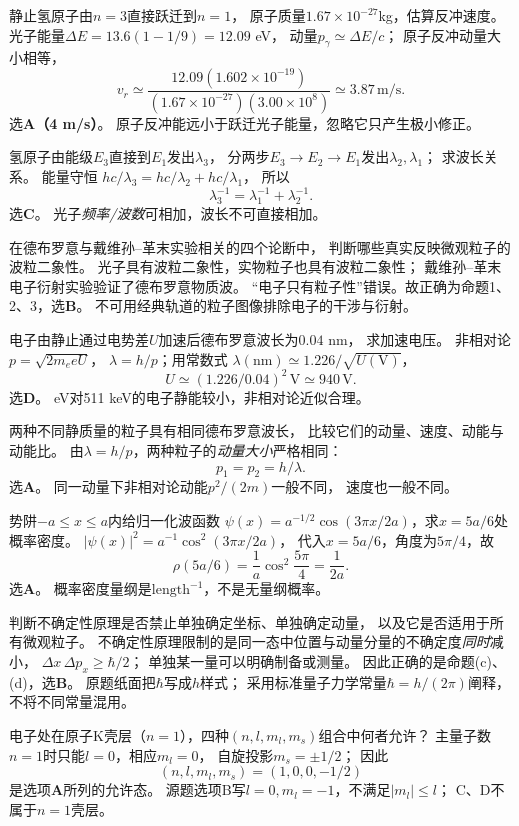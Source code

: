 \problemtext 静止氢原子由$n=3$直接跃迁到$n=1$，
原子质量$1.67\times10^{-27}$kg，估算反冲速度。
\workings
光子能量$\Delta E=13.6(1-1/9)=12.09$ eV，
动量$p_\gamma\simeq\Delta E/c$；
原子反冲动量大小相等，
\[
\boxed{v_r\simeq\frac{12.09(1.602\times10^{-19})}
{(1.67\times10^{-27})(3.00\times10^8)}
\simeq3.87\,\mathrm{m/s}}.
\]
选\textbf{A（4 m/s）}。
\crosscheck 原子反冲能远小于跃迁光子能量，忽略它只产生极小修正。

\problemtext 氢原子由能级$E_3$直接到$E_1$发出$\lambda_3$，
分两步$E_3\to E_2\to E_1$发出$\lambda_2,\lambda_1$；
求波长关系。
\workings
能量守恒
$hc/\lambda_3=hc/\lambda_2+hc/\lambda_1$，
所以
\[
\boxed{\lambda_3^{-1}=\lambda_1^{-1}+\lambda_2^{-1}}.
\]
选\textbf{C}。
\crosscheck 光子\emph{频率/波数}可相加，波长不可直接相加。

\problemtext 在德布罗意与戴维孙--革末实验相关的四个论断中，
判断哪些真实反映微观粒子的波粒二象性。
\workings
光子具有波粒二象性，实物粒子也具有波粒二象性；
戴维孙--革末电子衍射实验验证了德布罗意物质波。
“电子只有粒子性”错误。故正确为命题1、2、3，选\textbf{B}。
\crosscheck 不可用经典轨道的粒子图像排除电子的干涉与衍射。

\problemtext 电子由静止通过电势差$U$加速后德布罗意波长为$0.04$ nm，
求加速电压。
\workings
非相对论$p=\sqrt{2m_e eU}$，
$\lambda=h/p$；用常数式
$\lambda(\mathrm{nm})\simeq1.226/\sqrt{U(\mathrm V)}$，
\[
\boxed{U\simeq(1.226/0.04)^2\,\mathrm V
\simeq940\,\mathrm V}.
\]
选\textbf{D}。
 eV对511 keV的电子静能较小，非相对论近似合理。

\problemtext 两种不同静质量的粒子具有相同德布罗意波长，
比较它们的动量、速度、动能与动能比。
\workings
由$\lambda=h/p$，两种粒子的\emph{动量大小}严格相同：
\[
\boxed{p_1=p_2=h/\lambda}.
\]
选\textbf{A}。
\crosscheck 同一动量下非相对论动能$p^2/(2m)$一般不同，
速度也一般不同。

\problemtext 势阱$-a\le x\le a$内给归一化波函数
$\psi(x)=a^{-1/2}\cos(3\pi x/2a)$，求$x=5a/6$处概率密度。
\workings
$|\psi(x)|^2=a^{-1}\cos^2(3\pi x/2a)$，
代入$x=5a/6$，角度为$5\pi/4$，故
\[
\boxed{\rho(5a/6)=\frac1a\cos^2\frac{5\pi}{4}=\frac1{2a}}.
\]
选\textbf{A}。
\crosscheck 概率密度量纲是$\mathrm{length}^{-1}$，不是无量纲概率。

\problemtext 判断不确定性原理是否禁止单独确定坐标、单独确定动量，
以及它是否适用于所有微观粒子。
\workings
不确定性原理限制的是同一态中位置与动量分量的不确定度\emph{同时}减小，
$\Delta x\,\Delta p_x\ge\hbar/2$；
单独某一量可以明确制备或测量。
因此正确的是命题(c)、(d)，选\textbf{B}。
\crosscheck 原题纸面把$\hbar$写成$h$样式；
采用标准量子力学常量$\hbar=h/(2\pi)$阐释，不将不同常量混用。

\problemtext 电子处在原子K壳层（$n=1$），四种$(n,l,m_l,m_s)$组合中何者允许？
\workings
主量子数$n=1$时只能$l=0$，相应$m_l=0$，
自旋投影$m_s=\pm1/2$；
因此
\[
\boxed{(n,l,m_l,m_s)=(1,0,0,-1/2)}
\]
是选项\textbf{A}所列的允许态。
\crosscheck 源题选项B写$l=0,m_l=-1$，不满足$|m_l|\le l$；
C、D不属于$n=1$壳层。
